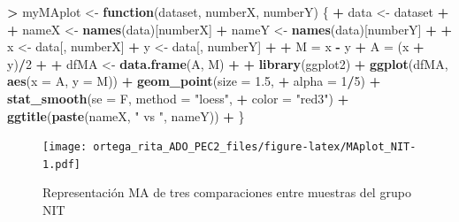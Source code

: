 \documentclass[
  english,
]{article}
\newenvironment{Shaded}{\begin{snugshade}}{\end{snugshade}}
\newcommand{\ControlFlowTok}[1]{\textcolor[rgb]{0.13,0.29,0.53}{\textbf{#1}}}
\newcommand{\DataTypeTok}[1]{\textcolor[rgb]{0.13,0.29,0.53}{#1}}
\newcommand{\DecValTok}[1]{\textcolor[rgb]{0.00,0.00,0.81}{#1}}
\newcommand{\FloatTok}[1]{\textcolor[rgb]{0.00,0.00,0.81}{#1}}
\newcommand{\KeywordTok}[1]{\textcolor[rgb]{0.13,0.29,0.53}{\textbf{#1}}}
\newcommand{\NormalTok}[1]{#1}
\newcommand{\OperatorTok}[1]{\textcolor[rgb]{0.81,0.36,0.00}{\textbf{#1}}}
\newcommand{\StringTok}[1]{\textcolor[rgb]{0.31,0.60,0.02}{#1}}
\begin{document}
\begin{Shaded}
\begin{Highlighting}[]
\OperatorTok{>}\StringTok{ }\NormalTok{myMAplot <-}\StringTok{ }\ControlFlowTok{function}\NormalTok{(dataset, numberX, numberY) \{}
\OperatorTok{+}\StringTok{     }\NormalTok{data <-}\StringTok{ }\NormalTok{dataset}
\OperatorTok{+}\StringTok{     }
\OperatorTok{+}\StringTok{     }\NormalTok{nameX <-}\StringTok{ }\KeywordTok{names}\NormalTok{(data)[numberX]}
\OperatorTok{+}\StringTok{     }\NormalTok{nameY <-}\StringTok{ }\KeywordTok{names}\NormalTok{(data)[numberY]}
\OperatorTok{+}\StringTok{     }
\OperatorTok{+}\StringTok{     }\NormalTok{x <-}\StringTok{ }\NormalTok{data[, numberX]}
\OperatorTok{+}\StringTok{     }\NormalTok{y <-}\StringTok{ }\NormalTok{data[, numberY]}
\OperatorTok{+}\StringTok{     }
\OperatorTok{+}\StringTok{     }\NormalTok{M =}\StringTok{ }\NormalTok{x }\OperatorTok{-}\StringTok{ }\NormalTok{y}
\OperatorTok{+}\StringTok{     }\NormalTok{A =}\StringTok{ }\NormalTok{(x }\OperatorTok{+}\StringTok{ }\NormalTok{y)}\OperatorTok{/}\DecValTok{2}
\OperatorTok{+}\StringTok{     }
\OperatorTok{+}\StringTok{     }\NormalTok{dfMA <-}\StringTok{ }\KeywordTok{data.frame}\NormalTok{(A, M)}
\OperatorTok{+}\StringTok{     }
\OperatorTok{+}\StringTok{     }\KeywordTok{library}\NormalTok{(ggplot2)}
\OperatorTok{+}\StringTok{     }\KeywordTok{ggplot}\NormalTok{(dfMA, }\KeywordTok{aes}\NormalTok{(}\DataTypeTok{x =}\NormalTok{ A, }\DataTypeTok{y =}\NormalTok{ M)) }\OperatorTok{+}\StringTok{ }\KeywordTok{geom_point}\NormalTok{(}\DataTypeTok{size =} \FloatTok{1.5}\NormalTok{, }
\OperatorTok{+}\StringTok{         }\DataTypeTok{alpha =} \DecValTok{1}\OperatorTok{/}\DecValTok{5}\NormalTok{) }\OperatorTok{+}\StringTok{ }\KeywordTok{stat_smooth}\NormalTok{(}\DataTypeTok{se =}\NormalTok{ F, }\DataTypeTok{method =} \StringTok{"loess"}\NormalTok{, }
\OperatorTok{+}\StringTok{         }\DataTypeTok{color =} \StringTok{"red3"}\NormalTok{) }\OperatorTok{+}\StringTok{ }\KeywordTok{ggtitle}\NormalTok{(}\KeywordTok{paste}\NormalTok{(nameX, }\StringTok{" vs "}\NormalTok{, nameY))}
\OperatorTok{+}\StringTok{ }\NormalTok{\}}
\end{Highlighting}
\end{Shaded}

\begin{figure}
\centering
\texttt{[image: ortega\_rita\_ADO\_PEC2\_files/figure-latex/MAplot\_NIT-1.pdf]}
\caption{Representación MA de tres comparaciones entre muestras del
grupo NIT}
\end{figure}
\end{document}
